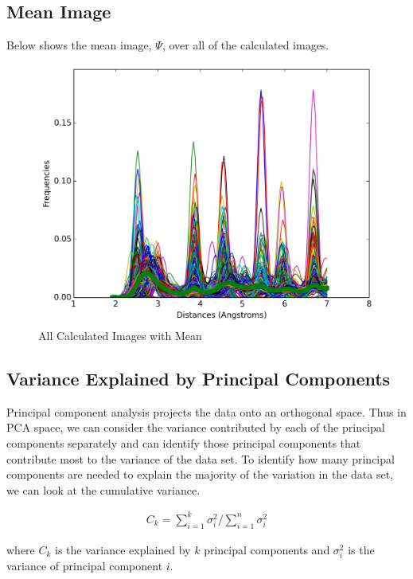 \documentclass[12pt,letterpaper]{article}
\begin{document}
\subsection{Mean Image}
Below shows the mean image, $\Psi$, over all of the calculated images.
\begin{figure}[ht]
  \begin{center}
    \includegraphics[scale=0.8]{figs/all_calc_images_mean.png}
    \caption{All Calculated Images with Mean}
  \end{center}
\end{figure}
\clearpage

\subsection{Variance Explained by Principal Components}
Principal component analysis projects the data onto an orthogonal space. Thus in
PCA space, we can consider the variance contributed by each of the principal
components separately and can identify those principal components that
contribute most to the variance of the data set. To identify how many principal
components are needed to explain the majority of the variation in the data set,
we can look at the cumulative variance.

\begin{align*}
  C_k = \sum_{i=1}^{k} \sigma_i^2 / \sum_{i=1}^n \sigma_i^2
\end{align*}

where $C_k$ is the variance explained by $k$ principal components and
$\sigma_i^2$ is the variance of principal component $i$.
\end{document}

